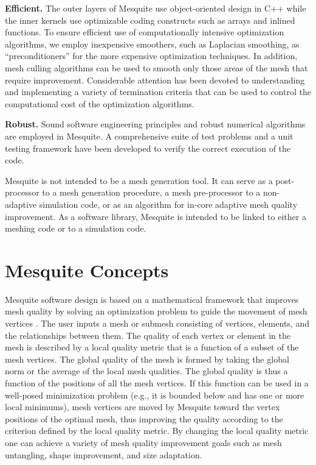 {\bf Efficient.}  The outer layers of Mesquite use 
object-oriented design in C++ while the inner kernels use
optimizable coding constructs such as arrays and inlined
functions.  To ensure efficient use of computationally intensive
optimization algorithms, we employ inexpensive smoothers, such as
Laplacian smoothing, as ``preconditioners'' for the more expensive
optimization techniques.  In addition, mesh culling algorithms can be
used to smooth only those areas of the mesh that require improvement.
Considerable attention has been devoted to understanding and
implementing a variety of termination criteria that can be used to
control the computational cost of the optimization algorithms. \newline

{\bf Robust.} Sound software engineering principles and robust numerical 
algorithms are employed in Mesquite. 
A comprehensive suite of test problems and a unit testing framework have
been developed to verify the correct execution of the code. \newline

Mesquite is not intended to be a mesh generation tool. It can serve as 
a post-processor to a mesh generation procedure, a mesh pre-processor to a 
non-adaptive simulation code, or as an algorithm for in-core adaptive mesh 
quality improvement. As a software library, Mesquite is intended to be
linked to either a meshing code or to a simulation code. \newline

\section{Mesquite Concepts} \label{sec:concepts}

Mesquite software design is based on a mathematical 
framework that improves mesh quality by solving an optimization 
problem to guide the movement of mesh vertices \cite{formal}. 
The user inputs a mesh or 
submesh consisting of vertices, elements, and the relationships between them. 
The quality of each vertex or 
element in the mesh is described by a local quality metric that is a function 
of a subset of the mesh vertices. The global quality of the mesh is formed by 
taking the global norm or the average of the local mesh qualities. The global 
quality is thus a function of the positions of all the mesh vertices. If this 
function can be used in a well-posed minimization problem (e.g., it is 
bounded below and has one or more local minimums), mesh vertices are moved 
by Mesquite toward the vertex positions of the optimal mesh, thus improving 
the quality according to the criterion defined by the local quality metric. 
By changing the local quality metric one can achieve a variety of mesh quality improvement goals such as mesh untangling, shape improvement, and size adaptation. \newline

